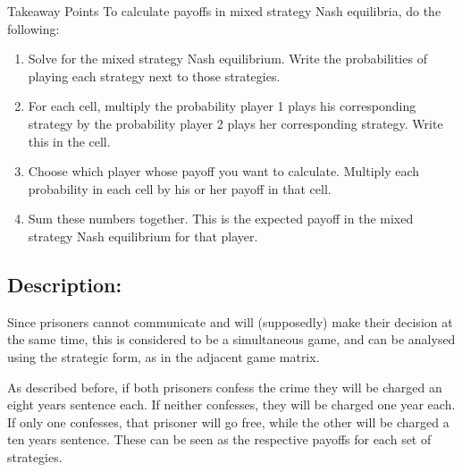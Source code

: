 \documentclass[]{report}
\begin{document}
Takeaway Points
To calculate payoffs in mixed strategy Nash equilibria, do the following:

\begin{enumerate}
	\item Solve for the mixed strategy Nash equilibrium. Write the probabilities of playing each strategy next to those strategies.
	\item	For each cell, multiply the probability player 1 plays his corresponding strategy by the probability player 2 plays her corresponding strategy. Write this in the cell.
	\item	Choose which player whose payoff you want to calculate. Multiply each probability in each cell by his or her payoff in that cell.
	\item	Sum these numbers together. This is the expected payoff in the mixed strategy Nash equilibrium for that player.
\end{enumerate}


\subsection{Description:}

Since prisoners cannot communicate and will (supposedly) make their decision at the same time, this is considered to be a simultaneous game, and can be analysed using the strategic form, as in the adjacent game matrix. 

As described before, if both prisoners confess the crime they will be charged an eight years sentence each. If neither confesses, they will be charged one year each. If only one confesses, that prisoner will go free, while the other will be charged a ten years sentence. These can be seen as the respective payoffs for each set of strategies.
\end{document}
